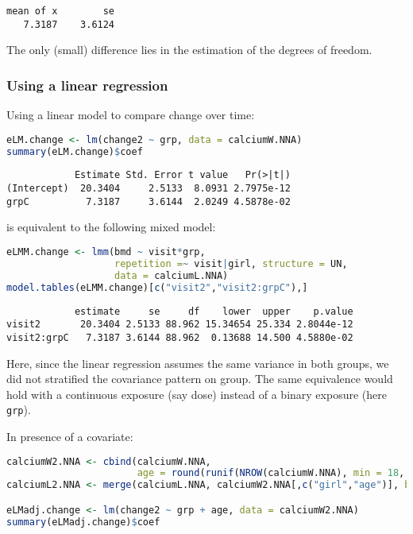 \documentclass[12pt]{article}
\begin{document}
\label{}
\begin{verbatim}
mean of x        se 
   7.3187    3.6124
\end{verbatim}


The only (small) difference lies in the estimation of the degrees of freedom.

\clearpage
\subsubsection{Using a linear regression}
\label{sec:orgb86a6e1}

Using a linear model to compare change over time:
\begin{lstlisting}[language=r,numbers=none]
eLM.change <- lm(change2 ~ grp, data = calciumW.NNA)
summary(eLM.change)$coef
\end{lstlisting}

\label{}
\begin{verbatim}
            Estimate Std. Error t value   Pr(>|t|)
(Intercept)  20.3404     2.5133  8.0931 2.7975e-12
grpC          7.3187     3.6144  2.0249 4.5878e-02
\end{verbatim}


is equivalent to the following mixed model:
\begin{lstlisting}[language=r,numbers=none]
eLMM.change <- lmm(bmd ~ visit*grp,
                   repetition =~ visit|girl, structure = UN,
                   data = calciumL.NNA)
model.tables(eLMM.change)[c("visit2","visit2:grpC"),]
\end{lstlisting}

\label{}
\begin{verbatim}
            estimate     se     df    lower  upper    p.value
visit2       20.3404 2.5133 88.962 15.34654 25.334 2.8044e-12
visit2:grpC   7.3187 3.6144 88.962  0.13688 14.500 4.5880e-02
\end{verbatim}


Here, since the linear regression assumes the same variance in both
groups, we did not stratified the covariance pattern on group. The
same equivalence would hold with a continuous exposure (say dose)
instead of a binary exposure (here \texttt{grp}).

\bigskip

In presence of a covariate:
\begin{lstlisting}[language=r,numbers=none]
calciumW2.NNA <- cbind(calciumW.NNA,
                       age = round(runif(NROW(calciumW.NNA), min = 18, max = 60)))
calciumL2.NNA <- merge(calciumL.NNA, calciumW2.NNA[,c("girl","age")], by = "girl")

eLMadj.change <- lm(change2 ~ grp + age, data = calciumW2.NNA)
summary(eLMadj.change)$coef
\end{lstlisting}
\end{document}
